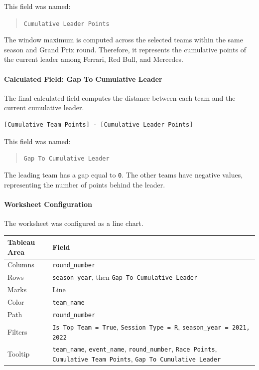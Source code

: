 \documentclass[12pt,a4paper]{article}
\begin{document}
	This field was named:
	
	\begin{quote}
		\texttt{Cumulative Leader Points}
	\end{quote}
	
	The window maximum is computed across the selected teams within the same season and Grand Prix round.
	Therefore, it represents the cumulative points of the current leader among Ferrari, Red Bull, and Mercedes.
	
	\paragraph{Calculated Field: Gap To Cumulative Leader}
	
	The final calculated field computes the distance between each team and the current cumulative leader.
	
	\begin{lstlisting}[basicstyle=\ttfamily\footnotesize]
		[Cumulative Team Points] - [Cumulative Leader Points]
	\end{lstlisting}
	
	This field was named:
	
	\begin{quote}
		\texttt{Gap To Cumulative Leader}
	\end{quote}
	
	The leading team has a gap equal to \texttt{0}.
	The other teams have negative values, representing the number of points behind the leader.
	
	\paragraph{Worksheet Configuration}
	
	The worksheet was configured as a line chart.
	
	\begin{longtable}{p{5cm} p{8cm}}
		\toprule
		\textbf{Tableau Area} & \textbf{Field} \\
		\midrule
		Columns & \texttt{round\_number} \\
		Rows & \texttt{season\_year}, then \texttt{Gap To Cumulative Leader} \\
		Marks & Line \\
		Color & \texttt{team\_name} \\
		Path & \texttt{round\_number} \\
		Filters & \texttt{Is Top Team = True}, \texttt{Session Type = R}, \texttt{season\_year = 2021, 2022} \\
		Tooltip & \texttt{team\_name}, \texttt{event\_name}, \texttt{round\_number}, \texttt{Race Points}, \texttt{Cumulative Team Points}, \texttt{Gap To Cumulative Leader} \\
		\bottomrule
	\end{longtable}
	
\end{document}
